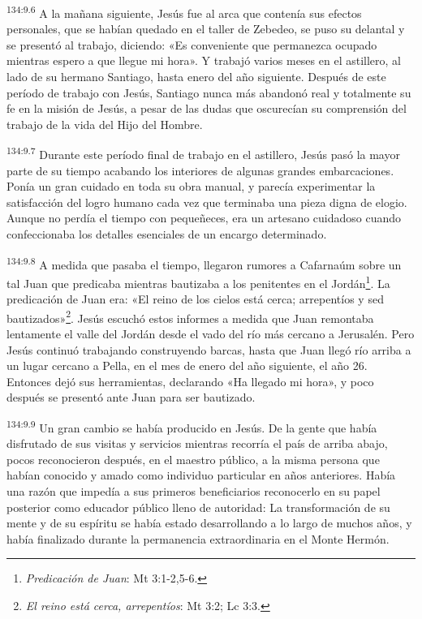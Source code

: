 \par
\textsuperscript{134:9.6} A la mañana siguiente, Jesús fue al arca que contenía sus efectos personales, que se habían quedado en el taller de Zebedeo, se puso su delantal y se presentó al trabajo, diciendo: «Es conveniente que permanezca ocupado mientras espero a que llegue mi hora». Y trabajó varios meses en el astillero, al lado de su hermano Santiago, hasta enero del año siguiente. Después de este período de trabajo con Jesús, Santiago nunca más abandonó real y totalmente su fe en la misión de Jesús, a pesar de las dudas que oscurecían su comprensión del trabajo de la vida del Hijo del Hombre.

\par
\textsuperscript{134:9.7} Durante este período final de trabajo en el astillero, Jesús pasó la mayor parte de su tiempo acabando los interiores de algunas grandes embarcaciones. Ponía un gran cuidado en toda su obra manual, y parecía experimentar la satisfacción del logro humano cada vez que terminaba una pieza digna de elogio. Aunque no perdía el tiempo con pequeñeces, era un artesano cuidadoso cuando confeccionaba los detalles esenciales de un encargo determinado.

\par
\textsuperscript{134:9.8} A medida que pasaba el tiempo, llegaron rumores a Cafarnaúm sobre un tal Juan que predicaba mientras bautizaba a los penitentes en el Jordán\footnote{\textit{Predicación de Juan}: Mt 3:1-2,5-6.}. La predicación de Juan era: «El reino de los cielos está cerca; arrepentíos y sed bautizados»\footnote{\textit{El reino está cerca, arrepentíos}: Mt 3:2; Lc 3:3.}. Jesús escuchó estos informes a medida que Juan remontaba lentamente el valle del Jordán desde el vado del río más cercano a Jerusalén. Pero Jesús continuó trabajando construyendo barcas, hasta que Juan llegó río arriba a un lugar cercano a Pella, en el mes de enero del año siguiente, el año 26. Entonces dejó sus herramientas, declarando «Ha llegado mi hora», y poco después se presentó ante Juan para ser bautizado.

\par
\textsuperscript{134:9.9} Un gran cambio se había producido en Jesús. De la gente que había disfrutado de sus visitas y servicios mientras recorría el país de arriba abajo, pocos reconocieron después, en el maestro público, a la misma persona que habían conocido y amado como individuo particular en años anteriores. Había una razón que impedía a sus primeros beneficiarios reconocerlo en su papel posterior como educador público lleno de autoridad: La transformación de su mente y de su espíritu se había estado desarrollando a lo largo de muchos años, y había finalizado durante la permanencia extraordinaria en el Monte Hermón.